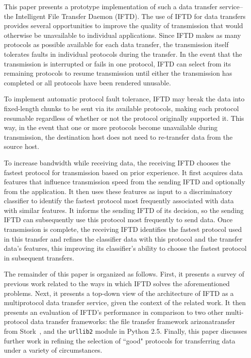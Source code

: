 This paper presents a prototype implementation of such a data transfer service--the Intelligent File Transfer Daemon (IFTD).  The use of IFTD for data transfers provides several opportunities to improve the quality of transmission that would otherwise be unavailable to individual applications.  Since IFTD makes as many protocols as possible available for each data transfer, the transmission itself tolerates faults in individual protocols during the transfer.  In the event that the transmission is interrupted or fails in one protocol, IFTD can select from its remaining protocols to resume transmission until either the transmission has completed or all protocols have been rendered unusable.

To implement automatic protocol fault tolerance, IFTD may break the data into fixed-length chunks to be sent via its available protocols, making each protocol resumable regardless of whether or not the protocol originally supported it.  This way, in the event that one or more protocols become unavailable during transmission, the destination host does not need to re-transfer data from the source host.

To increase bandwidth while receiving data, the receiving IFTD chooses the fastest protocol for transmission based on prior experience.  It first acquires data features that influence transmission speed from the sending IFTD and optionally from the application.  It then uses these features as input to a discriminatory classifier to identify the fastest protocol most frequently associated with data with similar features.  It informs the sending IFTD of its decision, so the sending IFTD can subsequently use this protocol most frequently to send data.  Once transmission is complete, the receiving IFTD identifies the fastest protocol used in this transfer and refines the classifier data with this protocol and the transfer data's features, this improving its classifier's ability to choose the fastest protocol in subsequent transfers.

The remainder of this paper is organized as follows.  First, it presents a survey of previous work related to the ways in which IFTD solves the aforementioned problems.  Next, it presents a top-down view of the architecture of IFTD as a multiprotocol data transfer service, given the context of the related work.  It then presents an evaluation of IFTD's performance in comparison to two other multi-protocol data transfer frameworks: the file transfer framework arizonatransfer from Stork~\cite{stork_paper}, and the \texttt{urllib2} module in Python 2.5.  Finally, this paper discusses further work in refining the selection of ``good" protocols for transferring data under a variety of circumstances.



